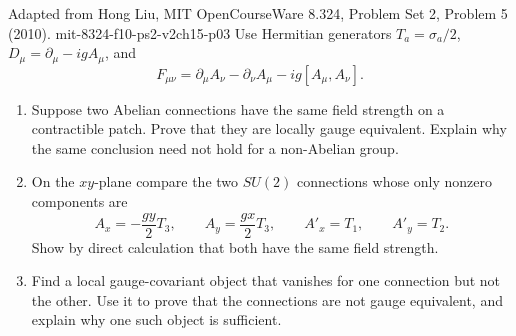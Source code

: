 \begin{enumerate}
  {Adapted from Hong Liu, MIT OpenCourseWare 8.324, Problem Set 2, Problem 5 (2010).}
  {mit-8324-f10-ps2-v2ch15-p03}
  Use Hermitian generators \(T_a=\sigma_a/2\),
  \(D_\mu=\partial_\mu-igA_\mu\), and
  \[
    F_{\mu\nu}=\partial_\mu A_\nu-\partial_\nu A_\mu
      -ig[A_\mu,A_\nu].
  \]
  \begin{enumerate}
    \item[(a)]
    Suppose two Abelian connections have the same field strength on a
    contractible patch.  Prove that they are locally gauge equivalent.
    Explain why the same conclusion need not hold for a non-Abelian group.
    \item[(b)]
    On the \(xy\)-plane compare the two \(SU(2)\) connections whose only
    nonzero components are
    \[
      A_x=-\frac{g y}{2}T_3,\qquad A_y=\frac{g x}{2}T_3,
      \qquad
      A'_x=T_1,\qquad A'_y=T_2.
    \]
    Show by direct calculation that both have the same field strength.
    \item[(c)]
    Find a local gauge-covariant object that vanishes for one connection
    but not the other.  Use it to prove that the connections are not gauge
    equivalent, and explain why one such object is sufficient.
  \end{enumerate}


\end{enumerate}

